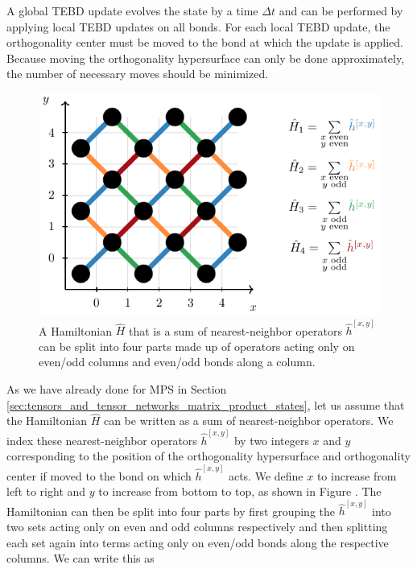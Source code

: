 A global TEBD update evolves the state by a time $\Delta t$ and can be performed by applying local TEBD updates on all bonds. For each local TEBD update, the orthogonality center must be moved to the bond at which the update is applied. Because moving the orthogonality hypersurface can only be done approximately, the number of necessary moves should be minimized. \par
\begin{figure}
	\centering
	\includegraphics[scale=1]{figures/tikz/YB_isoTPS/tebd_global_update/tebd_global_update_a.pdf}
	\caption{A Hamiltonian $\hat{H}$ that is a sum of nearest-neighbor operators $\hat{h}^{[x,y]}$ can be split into four parts made up of operators acting only on even/odd columns and even/odd bonds along a column.}
	\label{fig:YB_isoTPS_TEBD_global_update_TEBD1_splitting_and_TEBD2_chain}
\end{figure}
As we have already done for MPS in Section \ref{sec:tensors_and_tensor_networks_matrix_product_states}, let us assume that the Hamiltonian $\hat{H}$ can be written as a sum of nearest-neighbor operators. We index these nearest-neighbor operators $\hat{h}^{[x, y]}$ by two integers $x$ and $y$ corresponding to the position of the orthogonality hypersurface and orthogonality center if moved to the bond on which $\hat{h}^{[x,y]}$ acts. We define $x$ to increase from left to right and $y$ to increase from bottom to top, as shown in Figure . The Hamiltonian can then be split into four parts by first grouping the $\hat{h}^{[x,y]}$ into two sets acting only on even and odd columns respectively and then splitting each set again into terms acting only on even/odd bonds along the respective columns. We can write this as
